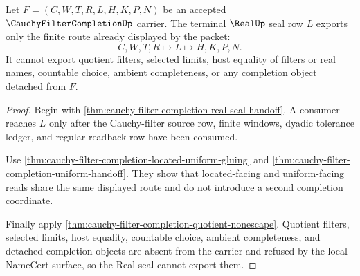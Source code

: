 \begin{theorem}
\label{thm:cauchy-filter-completion-real-seal-refusal}
Let $F=(C,W,T,R,L,H,K,P,N)$ be an accepted $\CauchyFilterCompletionUp$ carrier. The terminal $\RealUp$ seal row $L$ exports only the finite route already displayed by the packet:
$$
C,W,T,R \longmapsto L \longmapsto H,K,P,N .
$$
It cannot export quotient filters, selected limits, host equality of filters or real names, countable choice, ambient completeness, or any completion object detached from $F$.
\end{theorem}
\begin{proof}
Begin with \autoref{thm:cauchy-filter-completion-real-seal-handoff}. A consumer reaches $L$ only after the Cauchy-filter source row, finite windows, dyadic tolerance ledger, and regular readback row have been consumed.

Use \autoref{thm:cauchy-filter-completion-located-uniform-gluing} and \autoref{thm:cauchy-filter-completion-uniform-handoff}. They show that located-facing and uniform-facing reads share the same displayed route and do not introduce a second completion coordinate.

Finally apply \autoref{thm:cauchy-filter-completion-quotient-nonescape}. Quotient filters, selected limits, host equality, countable choice, ambient completeness, and detached completion objects are absent from the carrier and refused by the local NameCert surface, so the Real seal cannot export them.
\end{proof}

